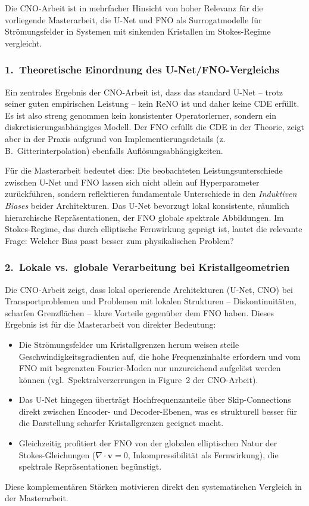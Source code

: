 \documentclass[a4paper,12pt]{article}
\begin{document}
Die CNO-Arbeit ist in mehrfacher Hinsicht von hoher Relevanz f\"ur die
vorliegende Masterarbeit, die U-Net und FNO als Surrogatmodelle f\"ur
Str\"omungsfelder in Systemen mit sinkenden Kristallen im Stokes-Regime
vergleicht.

\subsubsection*{1.\ Theoretische Einordnung des U-Net/FNO-Vergleichs}

Ein zentrales Ergebnis der CNO-Arbeit ist, dass das standard U-Net -- trotz
seiner guten empirischen Leistung -- kein ReNO ist und daher keine CDE
erf\"ullt. Es ist also streng genommen kein konsistenter Operatorlerner,
sondern ein diskretisierungsabh\"angiges Modell. Der FNO erfüllt die CDE
in der Theorie, zeigt aber in der Praxis aufgrund von Implementierungsdetails
(z.\,B.\ Gitterinterpolation) ebenfalls Aufl\"osungsabh\"angigkeiten.

F\"ur die Masterarbeit bedeutet dies: Die beobachteten Leistungsunterschiede
zwischen U-Net und FNO lassen sich nicht allein auf Hyperparameter
zur\"uckf\"uhren, sondern reflektieren fundamentale Unterschiede in den
\emph{Induktiven Biases} beider Architekturen. Das U-Net bevorzugt lokal
konsistente, r\"aumlich hierarchische Repr\"asentationen, der FNO globale
spektrale Abbildungen. Im Stokes-Regime, das durch elliptische Fernwirkung
gepr\"agt ist, lautet die relevante Frage: Welcher Bias passt besser zum
physikalischen Problem?

\subsubsection*{2.\ Lokale vs.\ globale Verarbeitung bei Kristallgeometrien}

Die CNO-Arbeit zeigt, dass lokal operierende Architekturen (U-Net, CNO)
bei Transportproblemen und Problemen mit lokalen Strukturen -- Diskontinuit\"aten,
scharfen Grenzfl\"achen -- klare Vorteile gegen\"uber dem FNO haben. Dieses
Ergebnis ist f\"ur die Masterarbeit von direkter Bedeutung:
\begin{itemize}
  \item Die Str\"omungsfelder um Kristallgrenzen herum weisen steile
    Geschwindigkeitsgradienten auf, die hohe Frequenzinhalte erfordern und
    vom FNO mit begrenzten Fourier-Moden nur unzureichend aufgel\"ost werden
    k\"onnen (vgl.\ Spektralverzerrungen in Figure~2 der CNO-Arbeit).
  \item Das U-Net hingegen \"ubertr\"agt Hochfrequenzanteile \"uber
    Skip-Connections direkt zwischen Encoder- und Decoder-Ebenen, was es
    strukturell besser f\"ur die Darstellung scharfer Kristallgrenzen geeignet
    macht.
  \item Gleichzeitig profitiert der FNO von der globalen elliptischen Natur
    der Stokes-Gleichungen ($\nabla \cdot \mathbf{v} = 0$, Inkompressibilit\"at
    als Fernwirkung), die spektrale Repr\"asentationen beg\"unstigt.
\end{itemize}
Diese komplementären St\"arken motivieren direkt den systematischen
Vergleich in der Masterarbeit.
\end{document}
